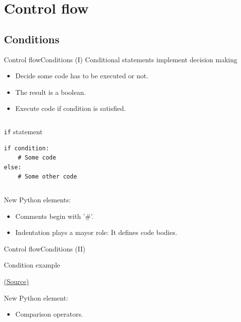 \documentclass[10pt,compress]{beamer} %
\begin{document}
\section{Control flow}
\subsection{Conditions}

\begin{frame}[fragile]{Control flow}{Conditions (I)}
	Conditional statements implement decision making
	\begin{itemize}
	\item Decide some code has to be executed or not.
	\item The result is a boolean.
	\item Execute code if condition is satisfied.
	\end{itemize}

	\begin{columns}
	\begin{block}{\texttt{if} statement}
		\begin{verbatim}
if condition:
    # Some code
else:
    # Some other code
\end{verbatim}
		\end{block}
	\end{columns}

   New Python elements:
	\begin{itemize}
	\item Comments begin with '\#'.
	\item \alert{Indentation plays a mayor role: It defines code bodies.}
	\end{itemize}
	
\end{frame}

\begin{frame}[fragile]{Control flow}{Conditions (II)}
	\begin{block}{Condition example}
	\vspace{-0.2cm}
		
	\end{block}
	\tiny{\href{http://anh.cs.luc.edu/python/hands-on/3.1/handsonHtml/ifstatements.html}{(Source)}}
	\\
	\normalsize{
	New Python element:
		\begin{itemize}
		\item Comparison operators.
		\end{itemize}
	}
\end{frame}
\end{document}
